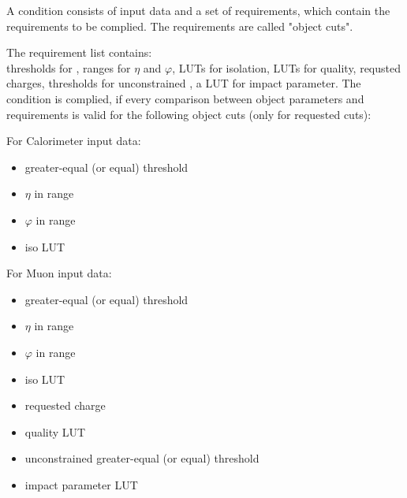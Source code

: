 A condition consists of input data and a set of requirements, which contain the requirements to be complied. The requirements are called "object cuts".

The requirement list contains:\\
thresholds for \pt, ranges for $\eta$ and $\varphi$, LUTs for isolation, LUTs for quality, requsted charges, thresholds for unconstrained \pt, a LUT for impact parameter.
The condition is complied, if every comparison between object parameters and requirements is valid for the following object cuts (only for requested cuts):

For Calorimeter input data:
\begin{itemize}
\item \pt greater-equal (or equal) threshold
\item $\eta$ in range
\item $\varphi$ in range
\item iso LUT
\end{itemize}

For Muon input data:
\begin{itemize}
\item \pt greater-equal (or equal) threshold
\item $\eta$ in range
\item $\varphi$ in range
\item iso LUT
\item requested charge
\item quality LUT
\item unconstrained \pt greater-equal (or equal) threshold
\item impact parameter LUT
\end{itemize}

